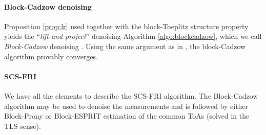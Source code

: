 \documentclass[journal,10pt]{IEEEtran}
\begin{document}
\paragraph{Block-Cadzow denoising} 
Proposition \ref{prop:lr} used together with the block-Toeplitz structure property yields the ``\emph{lift-and-project}'' denoising Algorithm \ref{algo:blockcadzow}, which we call  \emph{Block-Cadzow} denoising \cite{Hormati2010}. Using the same argument as in \cite{Cadzow1988}, the block-Cadzow algorithm provably converges. 



\paragraph{SCS-FRI}
We have all the elements to describe the SCS-FRI algorithm. 
The Block-Cadzow algorithm may be used to denoise the measurements and is followed by either Block-Prony or Block-ESPRIT estimation of the common ToAs (solved in the TLS sense).
\end{document}
